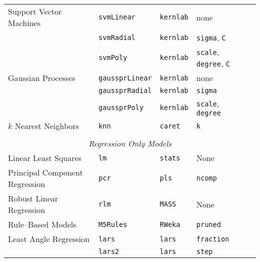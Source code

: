 \documentclass[12pt]{article}
\begin{document}
\begin{longtable}{lllll}
      Support Vector Machines  &
         \texttt{svmLinear} & 
            \texttt{kernlab}       & 
            none \\              
      
  &
         \texttt{svmRadial} & 
            \texttt{kernlab}       & 
            \texttt{sigma}, \texttt{C} \\             
      
  &
         \texttt{svmPoly} & 
            \texttt{kernlab}       & 
            \texttt{scale}, \texttt{degree}, \texttt{C} \\            
      
     Gaussian Processes  &
         \texttt{gaussprLinear} & 
            \texttt{kernlab}       & 
            none \\             
      
  &
         \texttt{gaussprRadial} & 
            \texttt{kernlab}       & 
            \texttt{sigma} \\              
      
  &
         \texttt{gaussprPoly} & 
            \texttt{kernlab}       & 
            \texttt{scale}, \texttt{degree} \\            

                      
      $k$ Nearest Neighbors &
         \texttt{knn} & 
            \texttt{caret}       & 
            \texttt{k} \\   
      
      \\
\multicolumn{5}{c}{{{ \em Regression Only Models}}} \\      
    
      Linear Least Squares &
         \texttt{lm} & 
            \texttt{stats}       & 
            None \\  

       Principal Component Regression &
         \texttt{pcr} & 
            \texttt{pls}       & 
            \texttt{ncomp}  \\  
           
      Robust Linear Regression &
         \texttt{rlm} & 
            \texttt{MASS}       & 
            None \\              
                   
      Rule--Based Models &
         \texttt{M5Rules} & 
            \texttt{RWeka}    & 
            \texttt{pruned}  \\             

     Least Angle   Regression&
         \texttt{lars} & 
            \texttt{lars}       & 
            \texttt{fraction} \\   
         &
         \texttt{lars2} & 
            \texttt{lars}       & 
            \texttt{step} \\            
                

\end{longtable}
\end{document}
